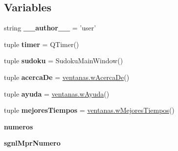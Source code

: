 \subsection*{Variables}
\begin{DoxyCompactItemize}
\item 
\hypertarget{namespace_sudoku_main_window_a6ae78ac4268752c431aac0753cef7fda}{string {\bfseries \-\_\-\-\_\-author\-\_\-\-\_\-} = 'user'}\label{namespace_sudoku_main_window_a6ae78ac4268752c431aac0753cef7fda}

\item 
\hypertarget{namespace_sudoku_main_window_a35d31b5601ce72462e732a6b20d49872}{tuple {\bfseries timer} = Q\-Timer()}\label{namespace_sudoku_main_window_a35d31b5601ce72462e732a6b20d49872}

\item 
\hypertarget{namespace_sudoku_main_window_adfbc10a324850ef667e112a43d373a3f}{tuple {\bfseries sudoku} = Sudoku\-Main\-Window()}\label{namespace_sudoku_main_window_adfbc10a324850ef667e112a43d373a3f}

\item 
\hypertarget{namespace_sudoku_main_window_af2c821d9cac0d9d48afe8dc47dd88796}{tuple {\bfseries acerca\-De} = \hyperlink{classventanas_1_1w_acerca_de}{ventanas.\-w\-Acerca\-De}()}\label{namespace_sudoku_main_window_af2c821d9cac0d9d48afe8dc47dd88796}

\item 
\hypertarget{namespace_sudoku_main_window_ad87780c011ac73ffd9418fa99e69a13c}{tuple {\bfseries ayuda} = \hyperlink{classventanas_1_1w_ayuda}{ventanas.\-w\-Ayuda}()}\label{namespace_sudoku_main_window_ad87780c011ac73ffd9418fa99e69a13c}

\item 
\hypertarget{namespace_sudoku_main_window_aaaf4c59bb37372582cb7062e6792c711}{tuple {\bfseries mejores\-Tiempos} = \hyperlink{classventanas_1_1w_mejores_tiempos}{ventanas.\-w\-Mejores\-Tiempos}()}\label{namespace_sudoku_main_window_aaaf4c59bb37372582cb7062e6792c711}

\item 
\hypertarget{namespace_sudoku_main_window_ad14f8dd6384d391f7167bfca8af9f5f5}{{\bfseries numeros}}\label{namespace_sudoku_main_window_ad14f8dd6384d391f7167bfca8af9f5f5}

\item 
\hypertarget{namespace_sudoku_main_window_a836c72d1cdb307710003bcc57214a8cd}{{\bfseries sgnl\-Mpr\-Numero}}\label{namespace_sudoku_main_window_a836c72d1cdb307710003bcc57214a8cd}


\end{DoxyCompactItemize}
